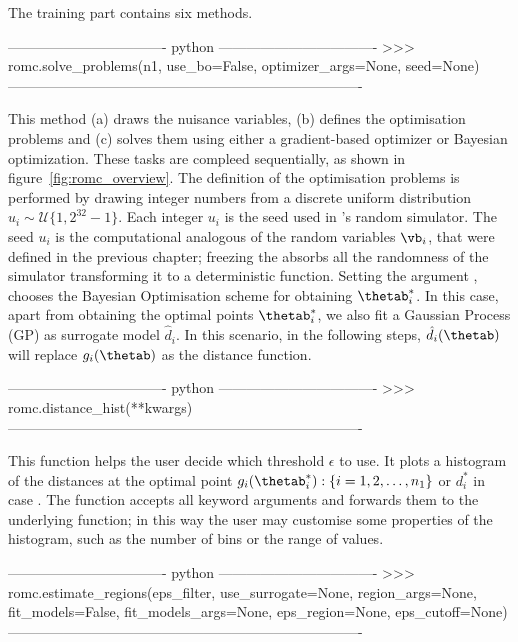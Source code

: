 The training part contains six methods.

\begin{Code}
---------------------------------- python ----------------------------------
>>> romc.solve_problems(n1,
                        use_bo=False,
                        optimizer_args=None,
                        seed=None)
----------------------------------------------------------------------------                    
\end{Code}


\noindent
This method (a) draws the nuisance variables, (b) defines the
optimisation problems and (c) solves them using either a
gradient-based optimizer or Bayesian optimization. These tasks are
compleed sequentially, as shown in figure~\ref{fig:romc_overview}. The
definition of the optimisation problems is performed by drawing
 integer numbers from a discrete uniform distribution
$u_i \sim \mathcal{U}\{1, 2^{32}-1\}$. Each integer $u_i$ is the seed
used in 's random simulator. The seed $u_i$ is the
computational analogous of the random variables $\vb_i$, that were
defined in the previous chapter; freezing the  absorbs all
the randomness of the simulator transforming it to a deterministic
function. Setting the argument , chooses the
Bayesian Optimisation scheme for obtaining $\thetab_i^*$. In this
case, apart from obtaining the optimal points $\thetab_i^*$, we also
fit a Gaussian Process (GP) as surrogate model $\hat{d}_i$. In this
scenario, in the following steps, $\hat{d}_i(\thetab)$ will replace
$g_i(\thetab)$ as the distance function.

\begin{Code}
---------------------------------- python ----------------------------------
>>> romc.distance_hist(**kwargs)
----------------------------------------------------------------------------  
\end{Code}

\noindent
This function helps the user decide which threshold $\epsilon$ to
use. It plots a histogram of the distances at the optimal point
$g_i(\thetab_i^*) : \{i = 1, 2, \ldots, n_1\}$ or $d_i^*$ in case
. The function accepts all keyword arguments and
forwards them to the underlying  function; in
this way the user may customise some properties of the histogram, such
as the number of bins or the range of values.

\begin{Code}
---------------------------------- python ----------------------------------  
>>> romc.estimate_regions(eps_filter,
                          use_surrogate=None,
                          region_args=None,
                          fit_models=False,
                          fit_models_args=None,
                          eps_region=None,
                          eps_cutoff=None)
----------------------------------------------------------------------------
\end{Code}

